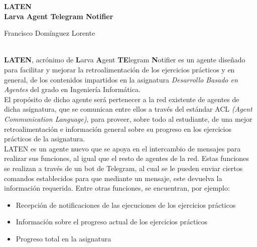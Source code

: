 \thispagestyle{empty}

\begin{center}
	{\large\bfseries LATEN \\ Larva Agent Telegram Notifier }\\
\end{center}
\begin{center}
	Francisco Domínguez Lorente\\
\end{center}


\vspace{0.5cm}
\vspace{0.7cm}

\\
	\textbf{LATEN}, acrónimo de \textbf{L}arva \textbf{A}gent \textbf{TE}legram \textbf{N}otifier es un agente diseñado para facilitar y mejorar la retroalimentación
	de los ejercicios prácticos y en general, de los contenidos impartidos en la asignatura \textit{Desarrollo Basado en Agentes} del grado en Ingeniería Informática.\\

	El propósito de dicho agente será pertenecer a la red existente de agentes de dicha asignatura, que se comunican entre ellos a través del estándar ACL \textit{(Agent Communication Language)},
	para proveer, sobre todo al estudiante, de una mejor retroalimentación e información general sobre su progreso en los ejercicios prácticos de la asignatura.\\

	LATEN es un agente nuevo que se apoya en el intercambio de mensajes para realizar sus funciones, al igual que el resto de agentes de la red. Estas funciones se realizan a través de un
	bot de Telegram, al cual se le pueden enviar ciertos comandos establecidos para que mediante un mensaje, este devuelva la información requerida. Entre otras funciones, se encuentran, por ejemplo:
    
	\begin{itemize}
		\item Recepción de notificaciones de las ejecuciones de los ejercicios prácticos
		\item Información sobre el progreso actual de los ejercicios prácticos
		\item Progreso total en la asignatura
	\end{itemize}
    
